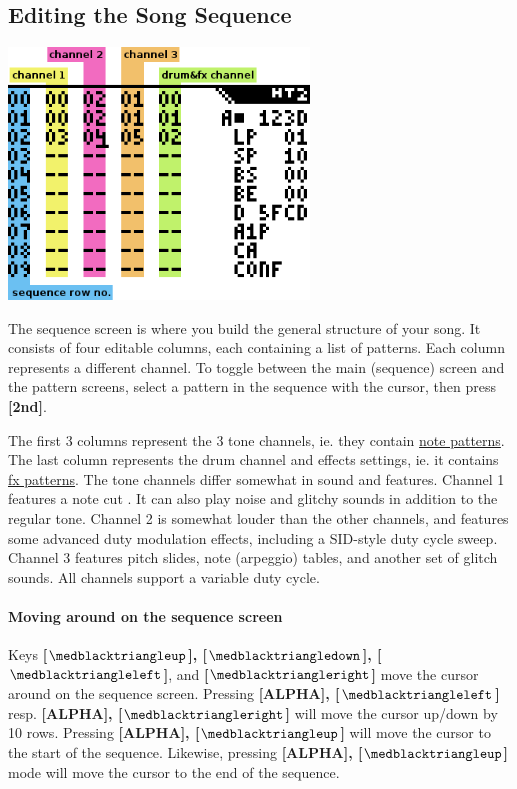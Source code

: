 \documentclass[12pt]{report}	%
\begin{document}
\subsection{Editing the Song Sequence}

{\includegraphics[width=0.6\textwidth]{seq}} \newline

The sequence screen is where you build the general structure of your song. It consists of four editable columns, each containing a list of patterns. Each column represents a different channel. To toggle between the main (sequence) screen and the pattern screens, select a pattern in the sequence with the cursor, then press \textbf{[2nd]}.

The first 3 columns represent the 3 tone channels, ie. they contain \hyperref[sec:notepat]{note patterns}. The last column represents the drum channel and effects settings, ie. it contains \hyperref[sec:fxpat]{fx patterns}. The tone channels differ somewhat in sound and features. Channel 1 features a note cut . It can also play noise and  glitchy sounds in addition to the regular tone. Channel 2 is somewhat louder than the other channels, and features some advanced duty modulation effects, including a SID-style duty cycle sweep. Channel 3 features pitch slides, note (arpeggio) tables, and another set of glitch sounds. All channels support a variable duty cycle.

\paragraph{Moving around on the sequence screen} Keys \textbf{[\(\medblacktriangleup\)], [\(\medblacktriangledown\)], [\(\medblacktriangleleft\)]}, and \textbf{[\(\medblacktriangleright\)]} move the cursor around on the sequence screen. Pressing \textbf{[ALPHA], [\(\medblacktriangleleft\)]} resp. \textbf{[ALPHA], [\(\medblacktriangleright\)]} will move the cursor up/down by 10 rows. Pressing \textbf{[ALPHA], [\(\medblacktriangleup\)]} will move the cursor to the start of the sequence. Likewise, pressing \textbf{[ALPHA], [\(\medblacktriangleup\)]} mode will move the cursor to the end of the sequence.
\end{document}
